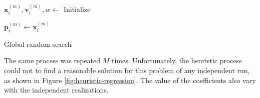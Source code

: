 \documentclass[12pt,a4paper]{article}
\begin{document}
\begin{algorithm}[H]
    \DontPrintSemicolon
      
      
      \(\mathbf{x}_i^{(m)}, \mathbf{v}_i^{(m)}, w \leftarrow \) Initialize

      \(\mathbf{p}_i^{(m)} \leftarrow \mathbf{x}_i^{(m)}\)

    
    \caption{Global random search}
    \label{alg:global-random-search}
\end{algorithm}

The same process was repeated \(M\) times. Unfortunately, the heuristic process could not to find a reasonable solution for this problem of any independent run, as shown in Figure \ref{fig:heuristic-regression}. The value of the coefficients also vary with the independent realizations.
\end{document}
